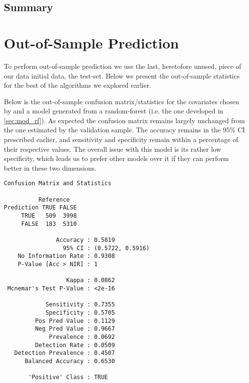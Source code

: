 \documentclass[11pt, fleqn]{article}
\begin{document}


\subsection{Summary}


\section{Out-of-Sample Prediction}
To perform out-of-sample prediction we use the last, heretofore unused, piece of our data initial data, the test-set.  Below we present the out-of-sample statistics for the best of the algorithms we explored earlier.

Below is the out-of-sample confusion matrix/statistics for the covariates chosen by and a model generated from a random-forest (i.e. the one developed in \cref{sec:mod_rf}).  As expected the confusion matrix remains largely unchanged from the one estimated by the validation sample.  The accuracy remains in the 95\% CI prescribed earlier, and sensitivity and specificity remain within a percentage of their respective values.  The overall issue with this model is its rather low specificity, which leads us to prefer other models over it if they can perform better in these two dimensions.

\begin{verbatim}
Confusion Matrix and Statistics

          Reference
Prediction TRUE FALSE
     TRUE   509  3998
     FALSE  183  5310
                                          
               Accuracy : 0.5819          
                 95% CI : (0.5722, 0.5916)
    No Information Rate : 0.9308          
    P-Value [Acc > NIR] : 1               
                                          
                  Kappa : 0.0862          
 Mcnemar's Test P-Value : <2e-16          
                                          
            Sensitivity : 0.7355          
            Specificity : 0.5705          
         Pos Pred Value : 0.1129          
         Neg Pred Value : 0.9667          
             Prevalence : 0.0692          
         Detection Rate : 0.0509          
   Detection Prevalence : 0.4507          
      Balanced Accuracy : 0.6530          
                                          
       'Positive' Class : TRUE
\end{verbatim}
\end{document}
